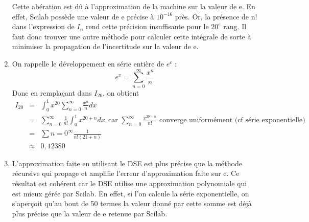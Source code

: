 \documentclass{article}
\begin{document}
\begin{enumerate}
            Cette abération est dû à l'approximation de la machine sur la valeur de e. En effet, Scilab possède une valeur de e précise à $10^{-16}$ près. Or, la présence de n! dans l'expression de $I_{n}$ rend cette précision insuffisante pour le $20^{e}$ rang.
            Il faut donc trouver une autre méthode pour calculer cette intégrale de sorte à minimiser la propagation de l'incertitude sur la valeur de e.

    \item On rappelle le développement en série entière de $e^{c}$ : 
        \begin{displaymath}
            e^{x} = \sum_{n=0}^{\infty} \frac{x^n}{n}
        \end{displaymath}
        Donc en remplaçant dans $I_{20}$, on obtient 
        \begin{eqnarray*}
            I_{20} & =&  \int_{0}^1 x^{20}\sum_{n=0}^{\infty} \frac{x^n}{n}dx \\
                   & =&  \sum_{n=0}^{\infty} \frac{1}{n!}\int_{0}^1 x^{20+n}dx \ \ \text{car $\sum_{n=0}^{\infty} \frac{x^{20+n}}{n!}$ converge uniformément (cf série exponentielle)} \\
                   & =&  \sum{n=0}^{\infty} \frac{1}{n! (21+n)} \\
                   & \approx&  0,12380
        \end{eqnarray*}

    \item L'approximation faite en utilisant le DSE est plus précise que la méthode récursive qui propage et amplifie l'erreur d'approximation faite sur e. Ce résultat est cohérent car le DSE utilise une approximation polynomiale qui est mieux gérée par Scilab. En effet, si l'on calcule la série exponentielle, on s'aperçoit qu'au bout de 50 termes la valeur donné par cette somme est déjà plus précise que la valeur de e retenue par Scilab.
        
\end{enumerate}
\end{document}
